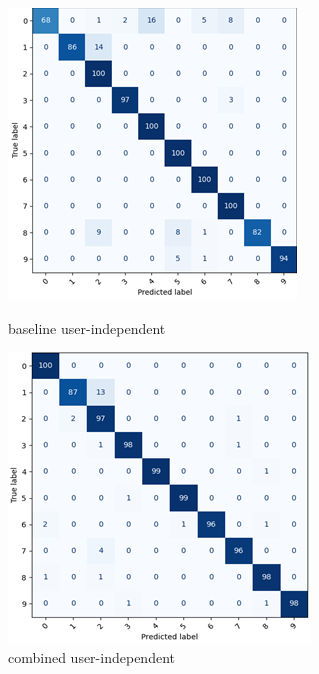 \documentclass{article}
\begin{document}
\begin{figure}[h]
    \centering
    \begin{minipage}{0.4\textwidth}
        \centering
        \includegraphics[width=\textwidth]{baseline_user-independent.png}
        \caption{baseline user-independent}
    \end{minipage}
    \hfill
    \begin{minipage}{0.4\textwidth}
        \centering
        \includegraphics[width=\textwidth]{combined_user-independent.png}
        \caption{combined user-independent}
    \end{minipage}
\end{figure}
\end{document}
